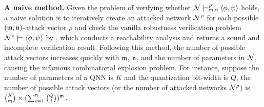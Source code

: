 \smallskip
\noindent
{\bf A naive method.}
Given the problem of verifying whether ${\mathcal{N}} \models^\rho_{\mathfrak{m},\mathfrak{n}} \langle \phi,\psi \rangle$ holds, a naive solution is to iteratively create an attacked network ${\mathcal{N}}^\rho$ for each possible $(\mathfrak{m},\mathfrak{n})$-attack vector $\rho$ and check the vanilla robustness verification problem $ {\mathcal{N}}^\rho \models \langle \phi,\psi \rangle$ by \deepPoly, which conducts a reachability analysis and returns a sound and incomplete verification result. 
% 
Following this method, the number of possible attack vectors increases quickly with $\mathfrak{m}$, $\mathfrak{n}$, and the number of parameters in ${\mathcal{N}}$, causing the infamous combinatorial explosion problem. 
% 
For instance, suppose the number of parameters of a QNN is $K$ and the quantization bit-width is $Q$, the number of possible attack vectors (or the number of attacked networks ${\mathcal{N}}^\rho$) is 
$\binom{K}{\mathfrak{m}}\times (\sum_{i=1}^{\mathfrak{n}}\binom{Q}{i})^{\mathfrak{m}}$. 

